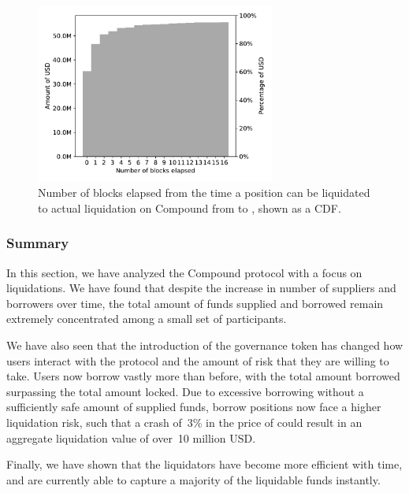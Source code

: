 \begin{figure}[tbp]
    \centering
    \includegraphics[width=0.7\textwidth]{./5b-economic-security/figures/time-to-liquidation.pdf}
    \caption{Number of blocks elapsed from the time a position can be liquidated to actual liquidation on Compound from \StartDate to \EndDate, shown as a CDF.}
    \label{fig:blocks-spent}
\end{figure}

\subsubsection{Summary}
In this section, we have analyzed the Compound protocol with a focus on liquidations.
We have found that despite the increase in number of suppliers and borrowers over time, the total amount of funds supplied and borrowed remain extremely concentrated among a small set of participants.

We have also seen that the introduction of the  governance token has changed how users interact with the protocol and the amount of risk that they are willing to take.
Users now borrow vastly more than before, with the total amount borrowed surpassing the total amount locked.
Due to excessive borrowing without a sufficiently safe amount of supplied funds, borrow positions now face a higher liquidation risk, such that a crash of~3\% in the price of  could result in an aggregate liquidation value of over~10 million USD.

Finally, we have shown that the liquidators have become more efficient with time, and are currently able to capture a majority of the liquidable funds instantly.
